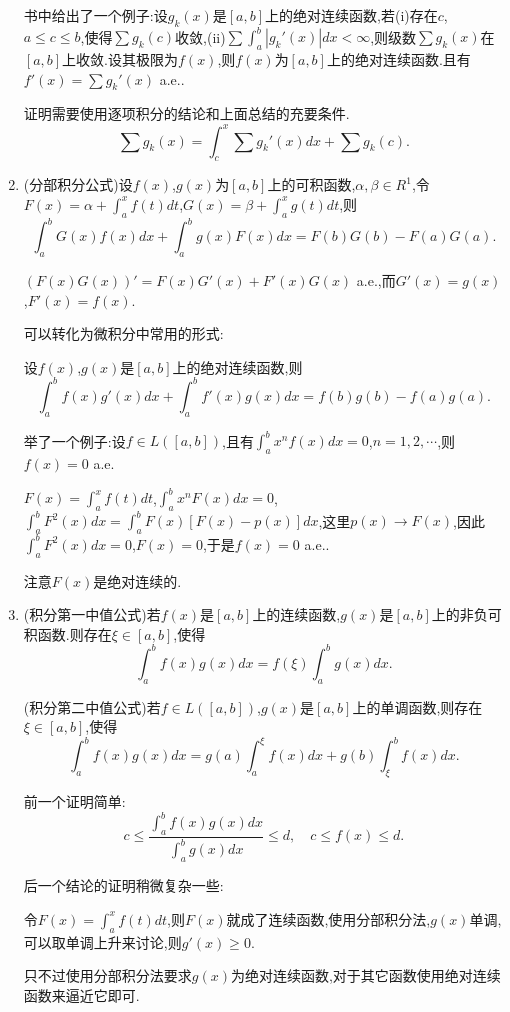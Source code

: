 \documentclass[12pt,a4paper,openany]{book}
\begin{document}
\begin{enumerate}
书中给出了一个例子:设$g_k(x)$是$[a,b]$上的绝对连续函数,若(i)存在$c$,$a\le c \le b$,使得$\sum{g_k(c)}$收敛,(ii)$\sum{\int_{a}^{b}{|g_k'(x)|dx}}<\infty$,则级数$\sum{g_k(x)}$在$[a,b]$上收敛.设其极限为$f(x)$,则$f(x)$为$[a,b]$上的绝对连续函数.且有$f'(x)=\sum{g_k'(x)}$ a.e..

证明需要使用逐项积分的结论和上面总结的充要条件.
\[
\sum{g_k(x)} = \int_{c}^{x}{\sum{g_k'(x)}dx} + \sum{g_k(c)}.
\]

\item (分部积分公式)设$f(x)$,$g(x)$为$[a,b]$上的可积函数,$\alpha,\beta \in R^1$,令$F(x)=\alpha+\int_{a}^{x}{f(t)dt}$,$G(x)=\beta+\int_{a}^{x}{g(t)dt}$,则
\[
\int_{a}^{b}{G(x)f(x)dx}+\int_{a}^{b}{g(x)F(x)dx} = F(b)G(b)-F(a)G(a).
\]

$(F(x)G(x))'=F(x)G'(x)+F'(x)G(x)$ a.e.,而$G'(x)=g(x)$,$F'(x)=f(x)$.

可以转化为微积分中常用的形式:

设$f(x)$,$g(x)$是$[a,b]$上的绝对连续函数,则
\[
\int_{a}^{b}{f(x)g'(x)dx} + \int_{a}^{b}{f'(x)g(x)dx} = f(b)g(b)-f(a)g(a).
\]

举了一个例子:设$f \in L([a,b])$,且有$\int_{a}^{b}{x^nf(x)dx}=0$,$n=1,2,\cdots$,则$f(x)=0$ a.e.

$F(x)=\int_{a}^{x}{f(t)dt}$,$\int_{a}^{b}{x^nF(x)dx}=0$,$\int_{a}^{b}{F^2(x)dx}=\int_{a}^{b}{F(x)[F(x)-p(x)]dx}$,这里$p(x) \rightarrow F(x)$,因此$\int_{a}^{b}{F^2(x)dx}=0$,$F(x)=0$,于是$f(x)=0$ a.e..

注意$F(x)$是绝对连续的.

\item (积分第一中值公式)若$f(x)$是$[a,b]$上的连续函数,$g(x)$是$[a,b]$上的非负可积函数.则存在$\xi \in [a,b]$,使得
\[
\int_{a}^{b}{f(x)g(x)dx}=f(\xi)\int_{a}^{b}{g(x)dx}.
\]

(积分第二中值公式)若$f \in L([a,b])$,$g(x)$是$[a,b]$上的单调函数,则存在$\xi \in [a,b]$,使得
\[
\int_{a}^{b}{f(x)g(x)dx} = g(a)\int_{a}^{\xi}{f(x)dx} + g(b)\int_{\xi}^{b}{f(x)dx}.
\]

前一个证明简单:
\[
c \le \frac{\int_{a}^{b}{f(x)g(x)dx}}{\int_{a}^{b}{g(x)dx}} \le d, \quad c \le f(x) \le d.
\]

后一个结论的证明稍微复杂一些:

令$F(x)=\int_{a}^{x}{f(t)dt}$,则$F(x)$就成了连续函数,使用分部积分法,$g(x)$单调,可以取单调上升来讨论,则$g'(x) \ge 0$.

只不过使用分部积分法要求$g(x)$为绝对连续函数,对于其它函数使用绝对连续函数来逼近它即可.

\end{enumerate}
\end{document}
